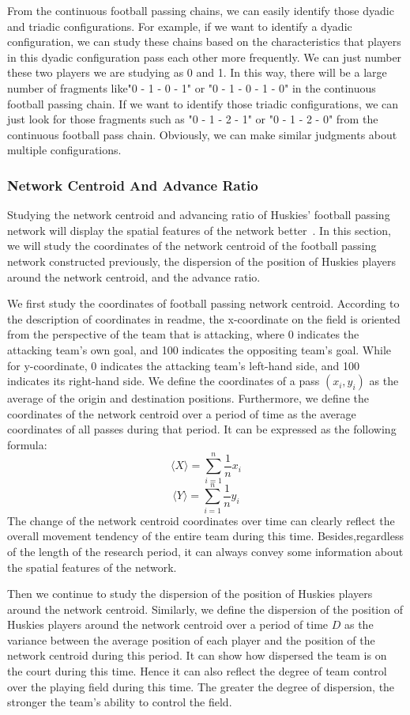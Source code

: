\documentclass{mcmthesis}
\begin{document}
	From the continuous football passing chains, we can easily identify those dyadic and triadic configurations.  For example, if we want to identify a dyadic configuration, we can study these chains based on the characteristics that players in this dyadic configuration pass each other more frequently.  We can just number these two players we are studying as 0 and 1. In this way, there will be a large number of fragments like"0 - 1 - 0 - 1" or "0 - 1 - 0 - 1 - 0" in the continuous football passing chain.  If we want to identify those triadic configurations, we can just look for those fragments such as "0 - 1 - 2 - 1" or "0 - 1 - 2 - 0" from the continuous football pass chain.  Obviously, we can make similar judgments about multiple configurations.
\subsubsection{Network Centroid And Advance Ratio}
	Studying the network centroid and advancing ratio of Huskies' football passing network will display the spatial features of the network better~\cite{First}.  In this section, we will study the coordinates of the network centroid of the football passing network constructed previously, the dispersion of the position of Huskies players around the network centroid, and the advance ratio.

	We first study the coordinates of football passing network centroid.  According to the description of coordinates in readme, the x-coordinate on the field is oriented from the perspective of the team that is attacking, where 0 indicates the attacking team's own goal, and 100 indicates the oppositing team's goal.  While for y-coordinate, 0 indicates the attacking team's left-hand side, and 100 indicates its right-hand side.  We define the coordinates of a pass $(x_{i}, y_{i})$ as the average of the origin and destination positions.  Furthermore, we define the coordinates of the network centroid over a period of time as the average coordinates of all passes during that period.  It can be expressed as the following formula: 
	$$\langle X \rangle=\sum_{i=1}^n\frac{1}{n} x_{i}$$
	$$\langle Y \rangle=\sum_{i=1}^n\frac{1}{n} y_{i}$$
	The change of the network centroid coordinates over time can clearly reflect the overall movement tendency of the entire team during this time.  Besides,regardless of the length of the research period, it can always convey some information about the spatial features of the network.

	Then we continue to study the dispersion of the position of Huskies players around the network centroid.  Similarly, we define the dispersion of the position of Huskies players around the network centroid over a period of time $D$ as the variance between the average position of each player and the position of the network centroid during this period.  It can show how dispersed the team is on the court during this time.  Hence it can also reflect the degree of team control over the playing field during this time.  The greater the degree of dispersion, the stronger the team's ability to control the field.
\end{document}
